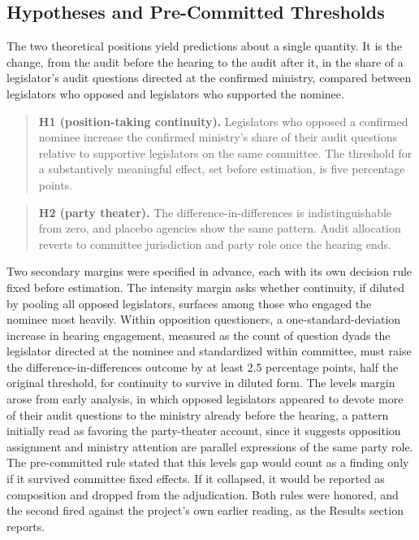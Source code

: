 \documentclass[11pt]{article}
\begin{document}
\subsection{Hypotheses and Pre-Committed Thresholds}

The two theoretical positions yield predictions about a single quantity. It is the change, from the audit before the hearing to the audit after it, in the share of a legislator's audit questions directed at the confirmed ministry, compared between legislators who opposed and legislators who supported the nominee.

\begin{quote}
\textbf{H1 (position-taking continuity).} Legislators who opposed a confirmed nominee increase the confirmed ministry's share of their audit questions relative to supportive legislators on the same committee. The threshold for a substantively meaningful effect, set before estimation, is five percentage points.
\end{quote}

\begin{quote}
\textbf{H2 (party theater).} The difference-in-differences is indistinguishable from zero, and placebo agencies show the same pattern. Audit allocation reverts to committee jurisdiction and party role once the hearing ends.
\end{quote}

Two secondary margins were specified in advance, each with its own decision rule fixed before estimation. The intensity margin asks whether continuity, if diluted by pooling all opposed legislators, surfaces among those who engaged the nominee most heavily. Within opposition questioners, a one-standard-deviation increase in hearing engagement, measured as the count of question dyads the legislator directed at the nominee and standardized within committee, must raise the difference-in-differences outcome by at least 2.5 percentage points, half the original threshold, for continuity to survive in diluted form. The levels margin arose from early analysis, in which opposed legislators appeared to devote more of their audit questions to the ministry already before the hearing, a pattern initially read as favoring the party-theater account, since it suggests opposition assignment and ministry attention are parallel expressions of the same party role. The pre-committed rule stated that this levels gap would count as a finding only if it survived committee fixed effects. If it collapsed, it would be reported as composition and dropped from the adjudication. Both rules were honored, and the second fired against the project's own earlier reading, as the Results section reports.
\end{document}
